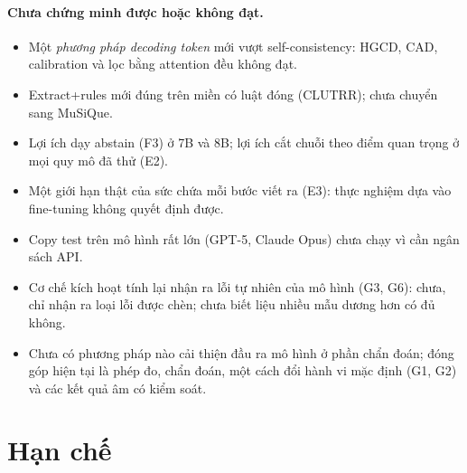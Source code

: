 \documentclass[11pt]{article}
\begin{document}
\paragraph{Chưa chứng minh được hoặc không đạt.}
\begin{itemize}[leftmargin=*,itemsep=1pt]
\item Một \emph{phương pháp decoding token} mới vượt self-consistency: HGCD, CAD, calibration và lọc
  bằng attention đều không đạt.
\item Extract+rules mới đúng trên miền có luật đóng (CLUTRR); chưa chuyển sang MuSiQue.
\item Lợi ích dạy abstain (F3) ở 7B và 8B; lợi ích cắt chuỗi theo điểm quan trọng ở mọi quy mô đã thử (E2).
\item Một giới hạn thật của sức chứa mỗi bước viết ra (E3): thực nghiệm dựa vào fine-tuning không quyết
  định được.
\item Copy test trên mô hình rất lớn (GPT-5, Claude Opus) chưa chạy vì cần ngân sách API.
\item Cơ chế kích hoạt tính lại nhận ra lỗi tự nhiên của mô hình (G3, G6): chưa, chỉ nhận ra loại lỗi được chèn; chưa biết liệu nhiều mẫu dương hơn có đủ không.
\item Chưa có phương pháp nào cải thiện đầu ra mô hình ở phần chẩn đoán; đóng góp hiện tại là phép đo,
  chẩn đoán, một cách đổi hành vi mặc định (G1, G2) và các kết quả âm có kiểm soát.
\end{itemize}

\section{Hạn chế}
\end{document}
